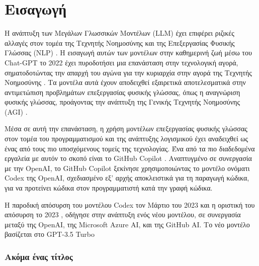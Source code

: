 \chapter{Εισαγωγή}
\label{ch:chapter1}




Η ανάπτυξη των Μεγάλων Γλωσσικών Μοντέλων \textlatin{(LLM)} έχει επιφέρει ριζικές αλλαγές στον τομέα της Τεχνητής Νοημοσύνης και της Επεξεργασίας Φυσικής Γλώσσας \textlatin{(NLP)} \cite{bommasani2021opportunities,zhao2023survey,zhou2023comprehensive}. Η εισαγωγή αυτών των μοντέλων στην καθημερινή ζωή μέσω του \textlatin{Chat-GPT} το 2022 \cite{openai2022chatgpt} έχει πυροδοτήσει μια επανάσταση στην τεχνολογική αγορά, σηματοδοτώντας την απαρχή του αγώνα για την κυριαρχία στην αγορά της Τεχνητής Νοημοσύνης \cite{guardian2024openai,nyt2024openai,verge2023chatgpt,liu2023chatgpt,trendforce2023ai}. Τα μοντέλα αυτά έχουν αποδειχθεί εξαιρετικά αποτελεσματικά στην αντιμετώπιση προβλημάτων επεξεργασίας φυσικής γλώσσας, όπως η αναγνώριση φυσικής γλώσσας, προάγοντας την ανάπτυξη της Γενικής Τεχνητής Νοημοσύνης \textlatin{(AGI)} \cite{adams2012mapping,goertzel2014agi}.

Μέσα σε αυτή την επανάσταση, η χρήση μοντέλων επεξεργασίας φυσικής γλώσσας στον τομέα του προγραμματισμού και της ανάπτυξης λογισμικού έχει αναδειχθεί ως ένας από τους πιο υποσχόμενους τομείς της τεχνολογίας. Ένα από τα πιο διαδεδομένα εργαλεία με αυτόν το σκοπό είναι το \textlatin{GitHub Copilot} \cite{github2021copilot}. Αναπτυγμένο σε συνεργασία με την \textlatin{OpenAI}, το \textlatin{GitHub Copilot} ξεκίνησε χρησιμοποιώντας το μοντέλο ονόματι \textlatin{Codex} της \textlatin{OpenAI}\cite{chen2021evaluating}, σχεδιασμένο εξ' αρχής αποκλειστικά για τη παραγωγή κώδικα, για να προτείνει κώδικα στον προγραμματιστή κατά την γραφή κώδικα.

Η παροδική απόσυρση του μοντέλου \textlatin{Codex} τον Μάρτιο του 2023 και η οριστική του απόσυρση το 2023 \cite{kemper2023openai}, οδήγησε στην ανάπτυξη ενός νέου μοντέλου, σε συνεργασία μεταξύ της \textlatin{OpenAI}, της \textlatin{Microsoft Azure AI}, και της \textlatin{GitHub AI}. Το νέο μοντέλο βασίζεται στο \textlatin{GPT-3.5 Turbo}\cite{github2023copilotupdate}
\subsection{Ακόμα ένας τίτλος}